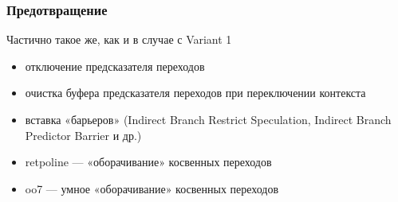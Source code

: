 \subsubsection{Предотвращение}
\begin{frame}{\insertsubsubsection}

  Частично такое же, как и в случае с Variant 1

  \begin{itemize}
  \item отключение предсказателя переходов
  \item очистка буфера предсказателя переходов при переключении контекста
  \item вставка «барьеров» (Indirect Branch Restrict Speculation, Indirect
    Branch Predictor Barrier и др.)
  \item retpoline --- «оборачивание» косвенных переходов
  \item oo7 --- умное «оборачивание» косвенных переходов
  \end{itemize}


\end{frame}